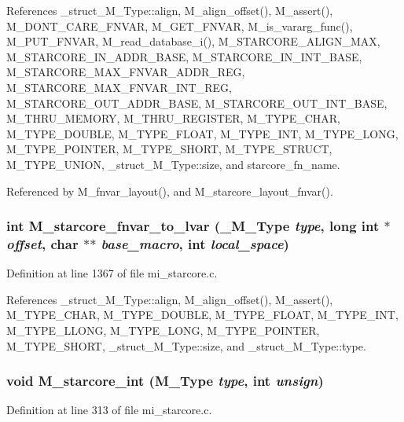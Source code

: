 References \_\-struct\_\-M\_\-Type::align, M\_\-align\_\-offset(), M\_\-assert(), M\_\-DONT\_\-CARE\_\-FNVAR, M\_\-GET\_\-FNVAR, M\_\-is\_\-vararg\_\-func(), M\_\-PUT\_\-FNVAR, M\_\-read\_\-database\_\-i(), M\_\-STARCORE\_\-ALIGN\_\-MAX, M\_\-STARCORE\_\-IN\_\-ADDR\_\-BASE, M\_\-STARCORE\_\-IN\_\-INT\_\-BASE, M\_\-STARCORE\_\-MAX\_\-FNVAR\_\-ADDR\_\-REG, M\_\-STARCORE\_\-MAX\_\-FNVAR\_\-INT\_\-REG, M\_\-STARCORE\_\-OUT\_\-ADDR\_\-BASE, M\_\-STARCORE\_\-OUT\_\-INT\_\-BASE, M\_\-THRU\_\-MEMORY, M\_\-THRU\_\-REGISTER, M\_\-TYPE\_\-CHAR, M\_\-TYPE\_\-DOUBLE, M\_\-TYPE\_\-FLOAT, M\_\-TYPE\_\-INT, M\_\-TYPE\_\-LONG, M\_\-TYPE\_\-POINTER, M\_\-TYPE\_\-SHORT, M\_\-TYPE\_\-STRUCT, M\_\-TYPE\_\-UNION, \_\-struct\_\-M\_\-Type::size, and starcore\_\-fn\_\-name.

Referenced by M\_\-fnvar\_\-layout(), and M\_\-starcore\_\-layout\_\-fnvar().
\subsubsection{\setlength{\rightskip}{0pt plus 5cm}int M\_\-starcore\_\-fnvar\_\-to\_\-lvar (\bf{\_\-M\_\-Type} {\em type}, long int $\ast$ {\em offset}, char $\ast$$\ast$ {\em base\_\-macro}, int {\em local\_\-space})}\label{mi__starcore_8c_5ae5bf39f35fd66941859ae064f38489}




Definition at line 1367 of file mi\_\-starcore.c.

References \_\-struct\_\-M\_\-Type::align, M\_\-align\_\-offset(), M\_\-assert(), M\_\-TYPE\_\-CHAR, M\_\-TYPE\_\-DOUBLE, M\_\-TYPE\_\-FLOAT, M\_\-TYPE\_\-INT, M\_\-TYPE\_\-LLONG, M\_\-TYPE\_\-LONG, M\_\-TYPE\_\-POINTER, M\_\-TYPE\_\-SHORT, \_\-struct\_\-M\_\-Type::size, and \_\-struct\_\-M\_\-Type::type.
\subsubsection{\setlength{\rightskip}{0pt plus 5cm}void M\_\-starcore\_\-int (\bf{M\_\-Type} {\em type}, int {\em unsign})}\label{mi__starcore_8c_9c6255b28f2525472693f83e6018fe4f}




Definition at line 313 of file mi\_\-starcore.c.

